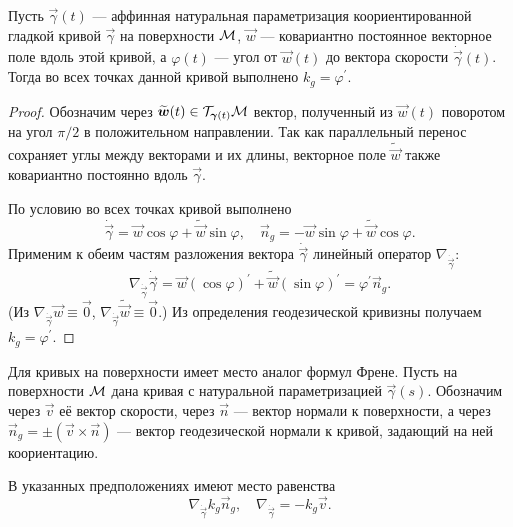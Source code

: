 
\begin{proposition} \label{proposition:AngleGeodesic}
	Пусть $\vec{\gamma}(t)$ --- аффинная натуральная параметризация коориентированной гладкой кривой $\vec{\gamma}$ на поверхности $\mathcal{M}$, $\vec{w}$ --- ковариантно постоянное векторное поле вдоль этой кривой, а $\varphi(t)$ --- угол от $\vec{w}(t)$ до вектора скорости $\dot{\vec{\gamma}}(t)$. Тогда во всех точках данной кривой выполнено $k_g = \varphi^\prime$.
\end{proposition}

\begin{proof}
	Обозначим через $\widetilde{\boldsymbol{w}}(t) \in \mathcal{T}_{\boldsymbol{\gamma}(t)}\mathcal{M}$ вектор, полученный из $\vec{w}(t)$ поворотом на угол $\pi / 2$ в положительном направлении. Так как параллельный перенос сохраняет углы между векторами и их длины, векторное поле $\widetilde{\vec{w}}$ также ковариантно постоянно вдоль $\vec{\gamma}$.

	По условию во всех точках кривой выполнено
	\[
		\dot{\vec{\gamma}} = \vec{w}\cos\varphi + \widetilde{\vec{w}}\sin\varphi,\quad
		\vec{n}_g = -\vec{w}\sin\varphi + \widetilde{\vec{w}}\cos\varphi.
	\]
	Применим к обеим частям разложения вектора $\dot{\vec{\gamma}}$ линейный оператор $\nabla_{\dot{\vec{\gamma}}}$:
	\[
		\nabla_{\dot{\vec{\gamma}}}\dot{\vec{\gamma}} = \vec{w}(\cos\varphi)^\prime + \widetilde{\vec{w}}(\sin\varphi)^\prime = \varphi^\prime\vec{n}_g.
	\]
	(Из $\nabla_{\dot{\vec{\gamma}}}\vec{w} \equiv \vec{0}$, $\nabla_{\dot{\vec{\gamma}}}\widetilde{\vec{w}} \equiv \vec{0}$.) Из определения геодезической кривизны получаем $k_g = \varphi^\prime$.
\end{proof}

Для кривых на поверхности имеет место аналог формул Френе. Пусть на поверхности $\mathcal{M}$ дана кривая с натуральной параметризацией $\vec{\gamma}(s)$. Обозначим через $\vec{v}$ её вектор скорости, через $\vec{n}$ --- вектор нормали к поверхности, а через $\vec{n}_g = \pm(\vec{v} \times \vec{n})$ --- вектор геодезической нормали к кривой, задающий на ней коориентацию. 

\begin{proposition}
	В указанных предположениях имеют место равенства
	\begin{equation} \label{eq:GeodesicFrenet}
		\nabla_{\dot{\vec{\gamma}}}k_g\vec{n}_g,\quad\nabla_{\dot{\vec{\gamma}}} = -k_g\vec{v}.
	\end{equation}
\end{proposition}

